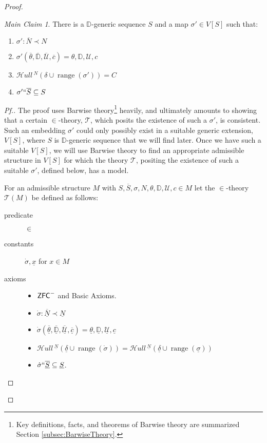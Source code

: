 \documentclass{amsart}
\theoremstyle{definition}
\theoremstyle{remark}
\newtheorem*{claim}{Main Claim}
\newcommand{\D}{\mathbb{D}}
\newcommand{\N}{{\overline{N}}}
\renewcommand{\S}{{\overline{S}}}
\newcommand{\U}{\mathcal{U}}
\newcommand{\ZFC}{\textup{\ensuremath{\textsf{ZFC}}}}
\DeclareMathOperator{\ran}{range}
\newcommand{\SH}{\mathcal{H}\textit{ull} \,}
\newcommand{\sk}[3]{\SH^{#1}( {#2} \cup {\ran(#3)} ) }
\begin{document}
\begin{proof}
\begin{claim} There is a $\D$-generic sequence $S$ and a map $\sigma' \in V[S]$ such that: \begin{enumerate}
	\item $\sigma': \N \prec N$
	\item $\sigma'(\overline \theta, \overline{\D}, \overline{\U}, \overline c)=\theta, \D, \U, c$
	\item \label{item:MainClaimC=Sk} $\sk{N}{\delta}{\sigma'} = C$	
	\item $\sigma' `` \S \subseteq S$
\end{enumerate} \end{claim}
\begin{proof}[Pf.]  The proof uses Barwise theory\footnote{Key definitions, facts, and theorems of Barwise theory are summarized Section \ref{subsec:BarwiseTheory}.} heavily, and ultimately amounts to showing that a certain 
$\in$-theory, $\mathcal T$, which posits the existence of such a $\sigma'$, is consistent. Such an embedding $\sigma'$ could only possibly exist in a suitable generic extension, $V[S]$, where $S$ is $\D$-generic sequence that we will find later.
Once we have such a suitable $V[S]$, we will use Barwise theory to find an appropriate admissible structure in $V[S]$ for which the theory $\mathcal T$, positing the existence of such a suitable $\sigma'$, defined below, has a model.

\begin{samepage}
For an admissible structure $M$ with $S, \overline S, \sigma, N, \theta, \D, \U, c \in M$ let the $\in$-theory $\mathcal T(M)$ be defined as follows: 
\begin{description}
	\item[predicate] $\in$ 
	\item[constants] $\dot{\sigma}, \underline x$ for $x \in M$
	\item[axioms] \begin{itemize} \item $\ZFC^-$ and \textsf{Basic Axioms}.
		\item $\dot \sigma : \overline{\underline N} \prec \underline N$
		\item $\dot{\sigma}(\overline{\underline{\theta}}, \overline{\underline{\D}}, \overline{\underline{\U}}, \overline{\underline c})=\underline{\theta}, \underline{\D}, \underline{\U}, \underline{c}$
		\item $\sk{\underline N}{\underline{\delta}}{\dot \sigma} = \sk{\underline N}{\underline \delta}{\underline \sigma}$
		\item $\dot \sigma ``\overline{\underline S} \subseteq \underline S$.
	\end{itemize}
\end{description}
\end{samepage}


\end{proof}
\end{proof}
\end{document}
